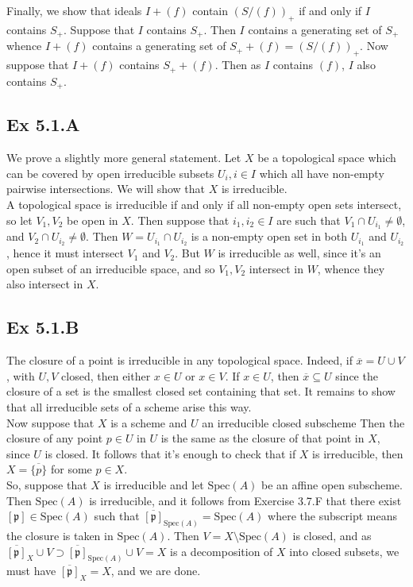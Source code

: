 \documentclass{article}
\theoremstyle{definition}
\newcommand{\Spec}{\text{Spec}}
\begin{document}
Finally, we show that ideals $I + (f)$ contain $(S/(f))_{+}$ if and only if $I$
contains $S_{+}$. Suppose that $I$ contains $S_{+}$. Then $I$ contains a
generating set of $S_{+}$ whence $I + (f)$ contains a generating set of $S_{+}
+ (f) = (S/(f))_{+}$. Now suppose that $I + (f)$ contains $S_{+} + (f)$. Then
as $I$ contains $(f)$, $I$ also contains $S_{+}$.

\subsection*{Ex 5.1.A}

We prove a slightly more general statement. Let $X$ be a topological space which
can be covered by open irreducible subsets  $U_i, i \in I$ which all
have non-empty pairwise intersections. We will show that $X$ is irreducible. \\

A topological space is irreducible if and only if all non-empty open sets
intersect, so let $V_1, V_2$ be open in $X$. Then suppose that $i_1, i_2 \in I$
are such that $V_1 \cap U_{i_1} \not = \emptyset$, and $V_2 \cap U_{i_2} \not =
\emptyset$. Then $W = U_{i_1} \cap U_{i_2}$ is a non-empty open set in both
$U_{i_1}$ and $U_{i_2}$, hence it must intersect $V_1$ and $V_2$. But $W$ is
irreducible as well, since it's an open subset of an irreducible space, and so
$V_1, V_2$ intersect in $W$, whence they also intersect in $X$.

\subsection*{Ex 5.1.B}

The closure of a point is irreducible in any topological space. Indeed, if
$\overline{x} = U \cup V$, with $U, V$ closed, then either $x \in U$ or $x \in
V$. If $x \in U$, then $\overline{x} \subseteq U$ since the closure of a set is
the smallest closed set containing that set. It remains to show that all
irreducible sets of a scheme arise this way. \\

Now suppose that $X$ is a scheme and $U$ an irreducible closed subscheme Then
the closure of any point $p \in U$ in $U$ is the same as the closure of that
point in $X$, since $U$ is closed. It follows that it's enough to check that if
$X$ is irreducible, then $X = \overline{\{p\}}$ for some $p \in X$. \\

So, suppose that $X$ is irreducible and let $\Spec(A)$ be an affine open
subscheme. Then $\Spec(A)$ is irreducible, and it follows from Exercise 3.7.F
that there exist $[\mathfrak{p}] \in \Spec(A)$ such that
$\overline{[\mathfrak{p}]}_{\Spec(A)} = \Spec(A)$ where the subscript means the
closure is taken in $\Spec(A)$. Then $V = X \setminus \Spec(A)$ is closed, and
as $\overline{[\mathfrak{p}]}_X \cup V \supset
\overline{[\mathfrak{p}]}_{\Spec(A)} \cup V = X$ is a decomposition of $X$ into
closed subsets, we must have $\overline{[\mathfrak{p}]}_X = X$, and we are
done.
\end{document}
